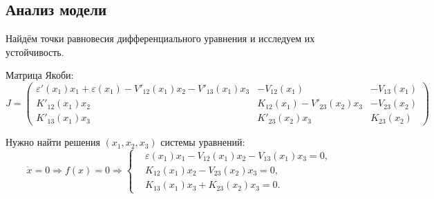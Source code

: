 \subsection{Анализ модели}
    Найдём точки равновесия дифференциального уравнения и исследуем их устойчивость.

    Матрица Якоби:
    \[
        J = \left(
            \begin{matrix}
                \varepsilon'(x_1) x_1 + \varepsilon(x_1) - V'_{12}(x_1) x_2 - V'_{13} (x_1) x_3 & -V_{12} (x_1) & -V_{13} (x_1) \\
                K'_{12} (x_1) x_2 & K_{12}(x_1) - V'_{23} (x_2) x_3 & -V_{23}(x_2) \\
                K'_{13} (x_1) x_3 & K'_{23} (x_2) x_3 & K_{23} (x_2)
            \end{matrix}
        \right)
    \]

    Нужно найти решения \( (x_1, x_2, x_3) \) системы уравнений:
    \[
        \dot{x} = 0 
        \Rightarrow 
        f(x) = 0
        \Rightarrow
        \left\{\begin{split}
            & \varepsilon(x_1)x_1 - V_{12}(x_1)x_2 - V_{13}(x_1)x_3 = 0, \\
            & K_{12}(x_1)x_2 - V_{23}(x_2)x_3 = 0, \\
            & K_{13}(x_1)x_3 + K_{23}(x_2)x_3 = 0. 
        \end{split}\right.
    \]

